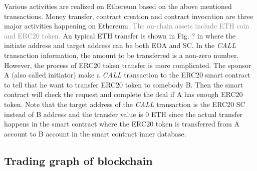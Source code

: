 Various activities are realized on Ethereum based on the above mentioned transactions. Money transfer, contract creation and contract invocation are three major activities happening on Ethereum\cite{chen2018infocom}. \textcolor{gray}{The on-chain assets include ETH coin and ERC20 token.} An typical ETH transfer is shown in Fig. ? in where the initiate address and target address can be both EOA and SC. In the \emph{CALL} transaction information, the amount to be transferred is a non-zero number. However, the process of ERC20 token transfer is more complicated. The sponsor A (also called initiator) make a \emph{CALL} transaction to the ERC20 smart contract to tell that he want to transfer ERC20 token to somebody B. Then the smart contract will check the request and complete the deal if A has enough ERC20 token. Note that the target address of the \emph{CALL} transaction is the ERC20 SC instead of B address and the transfer value is $0$ ETH since the actual transfer happens in the smart contract where the ERC20 token is transferred from A account to B account in the smart contract inner database. 




\subsection{Trading graph of blockchain}
